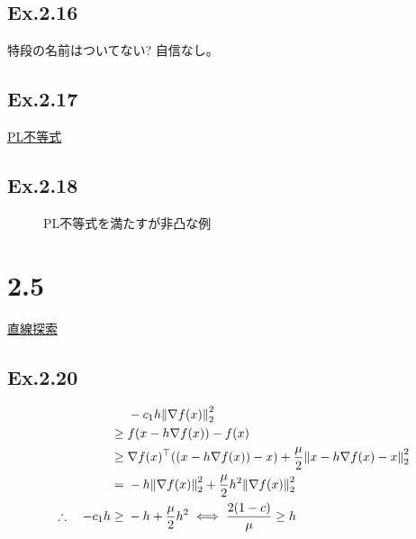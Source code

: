 \documentclass[a4paper, 14pt, dvipdfmx]{extarticle}
\begin{document}
\subsection*{Ex.2.16}

特段の名前はついてない? 自信なし。

\subsection*{Ex.2.17}

\href{https://en.wikipedia.org/wiki/%C5%81ojasiewicz_inequality}{PL不等式}

\subsection*{Ex.2.18}

\begin{figure}[H]
    \centering
    \caption{PL不等式を満たすが非凸な例}
\end{figure}

\section*{2.5}

\href{https://tm23forest.com/contents/linesearch-armijo-wolfe-condition-explained-visually}{直線探索}

\subsection*{Ex.2.20}

\begin{align*}
                                   & -c_1 h \norm{\nabla f(x)}_2^2                                                           \\
    \geq{}                         & f(x- h \nabla f(x)) - f(x)                                                              \\
    \geq{}                         & \nabla f(x)^\top ((x-h \nabla f(x)) - x) + \frac{\mu}{2} \norm{x-h \nabla f(x) - x}_2^2 \\
    ={}                            & -h \norm{\nabla f(x)}_2^2 + \frac{\mu}{2} h^2 \norm{\nabla f(x)}_2^2                    \\
    \therefore \quad -c_1 h \geq{} & -h + \frac{\mu}{2} h^2 \iff \frac{2(1-c)}{\mu} \geq h
\end{align*}
\end{document}
